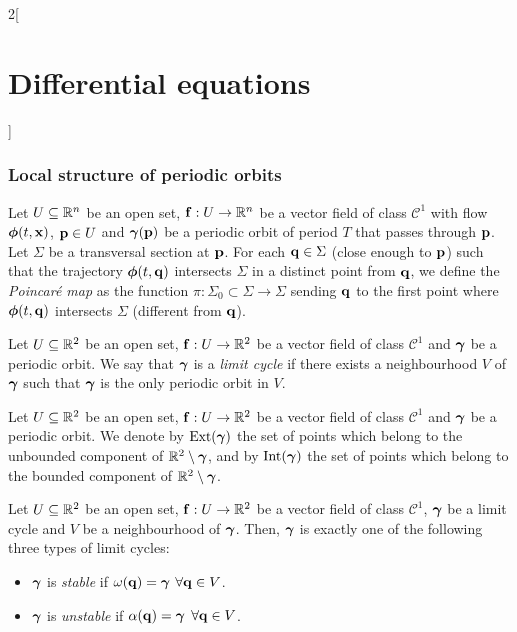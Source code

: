 \documentclass[../../../main_math.tex]{subfiles}
\begin{document}
\begin{multicols}{2}[\section{Differential equations}]
  \subsubsection{Local structure of periodic orbits}
  \begin{definition}
    Let $U\subseteq \mathbb{R}^n$ be an open set, $\boldsymbol{\mathrm{f}}:U\rightarrow\mathbb{R}^n$ be a vector field of class $\mathcal{C}^1$ with flow $\boldsymbol{\mathrm{\phi}}(t,\boldsymbol{\mathrm{x}})$, $\boldsymbol{\mathrm{p}}\in U$ and $\boldsymbol{\mathrm{\gamma}}(\boldsymbol{\mathrm{p}})$ be a periodic orbit of period $T$ that passes through $\boldsymbol{\mathrm{p}}$. Let $\Sigma$ be a transversal section at $\boldsymbol{\mathrm{p}}$. For each $\boldsymbol{\mathrm{q}}\in\Sigma$ (close enough to $\boldsymbol{\mathrm{p}}$) such that the trajectory $\boldsymbol{\mathrm{\phi}}(t,\boldsymbol{\mathrm{q}})$ intersects $\Sigma$ in a distinct point from $\boldsymbol{\mathrm{q}}$, we define the \emph{Poincaré map} as the function $\pi:\Sigma_0\subset \Sigma\rightarrow\Sigma$ sending $\boldsymbol{\mathrm{q}}$ to the first point where $\boldsymbol{\mathrm{\phi}}(t,\boldsymbol{\mathrm{q}})$ intersects $\Sigma$ (different from $\boldsymbol{\mathrm{q}}$).
  \end{definition}
  \begin{definition}
    Let $U\subseteq \mathbb{R}^2$ be an open set, $\boldsymbol{\mathrm{f}}:U\rightarrow\mathbb{R}^2$ be a vector field of class $\mathcal{C}^1$ and $\boldsymbol{\mathrm{\gamma}}$ be a periodic orbit. We say that $\boldsymbol{\mathrm{\gamma}}$ is a \emph{limit cycle} if there exists a neighbourhood $V$ of $\boldsymbol{\mathrm{\gamma}}$ such that $\boldsymbol{\mathrm{\gamma}}$ is the only periodic orbit in $V$.
  \end{definition}
  \begin{definition}
    Let $U\subseteq \mathbb{R}^2$ be an open set, $\boldsymbol{\mathrm{f}}:U\rightarrow\mathbb{R}^2$ be a vector field of class $\mathcal{C}^1$ and $\boldsymbol{\mathrm{\gamma}}$ be a periodic orbit. We denote by $\operatorname{Ext}(\boldsymbol{\mathrm{\gamma}})$ the set of points which belong to the unbounded component of $\mathbb{R}^2\setminus\boldsymbol{\mathrm{\gamma}}$, and by $\operatorname{Int}(\boldsymbol{\mathrm{\gamma}})$ the set of points which belong to the bounded component of $\mathbb{R}^2\setminus\boldsymbol{\mathrm{\gamma}}$.
  \end{definition}
  \begin{proposition}
    Let $U\subseteq \mathbb{R}^2$ be an open set, $\boldsymbol{\mathrm{f}}:U\rightarrow\mathbb{R}^2$ be a vector field of class $\mathcal{C}^1$, $\boldsymbol{\mathrm{\gamma}}$ be a limit cycle and $V$ be a neighbourhood of $\boldsymbol{\mathrm{\gamma}}$. Then, $\boldsymbol{\mathrm{\gamma}}$ is exactly one of the following three types of limit cycles:
    \begin{itemize}
      \item $\boldsymbol{\mathrm{\gamma}}$ is \emph{stable} if $\omega(\boldsymbol{\mathrm{q}})=\boldsymbol{\mathrm{\gamma}}$ $\forall \boldsymbol{\mathrm{q}}\in V$.
      \item $\boldsymbol{\mathrm{\gamma}}$ is \emph{unstable} if $\alpha(\boldsymbol{\mathrm{q}})=\boldsymbol{\mathrm{\gamma}}$ $\forall \boldsymbol{\mathrm{q}}\in V$.

\end{itemize}
\end{proposition}
\end{multicols}
\end{document}

